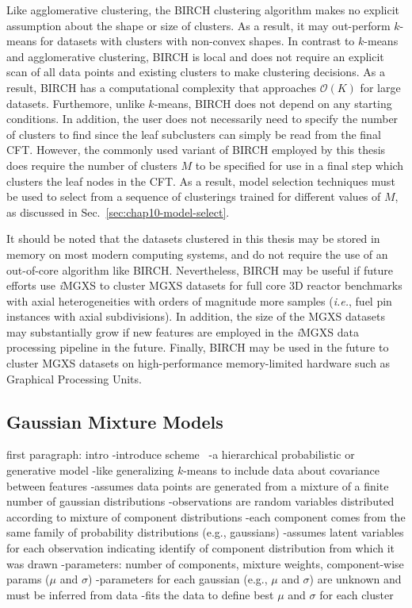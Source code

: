 Like agglomerative clustering, the BIRCH clustering algorithm makes no explicit assumption about the shape or size of clusters. As a result, it may out-perform $k$-means for datasets with clusters with non-convex shapes. In contrast to $k$-means and agglomerative clustering, BIRCH is local and does not require an explicit scan of all data points and existing clusters to make clustering decisions. As a result, BIRCH has a computational complexity that approaches $\mathcal{O}(K)$ for large datasets. Furthemore, unlike $k$-means, BIRCH does not depend on any starting conditions. In addition, the user does not necessarily need to specify the number of clusters to find since the leaf subclusters can simply be read from the final CFT. However, the commonly used variant of BIRCH employed by this thesis does require the number of clusters $M$ to be specified for use in a final step which clusters the leaf nodes in the CFT. As a result, model selection techniques must be used to select from a sequence of clusterings trained for different values of $M$, as discussed in Sec.~\ref{sec:chap10-model-select}.

It should be noted that the datasets clustered in this thesis may be stored in memory on most modern computing systems, and do not require the use of an out-of-core algorithm like BIRCH. Nevertheless, BIRCH may be useful if future efforts use \textit{i}\ac{MGXS} to cluster \ac{MGXS} datasets for full core 3D reactor benchmarks with axial heterogeneities with orders of magnitude more samples (\textit{i.e.}, fuel pin instances with axial subdivisions). In addition, the size of the \ac{MGXS} datasets may substantially grow if new features are employed in the \textit{i}\ac{MGXS} data processing pipeline in the future. Finally, BIRCH may be used in the future to cluster \ac{MGXS} datasets on high-performance memory-limited hardware such as Graphical Processing Units.

\subsection{Gaussian Mixture Models}
\label{subsec:chap10-gmms}

first paragraph: intro
-introduce scheme~\cite{mclachlan1988mixture}
-a hierarchical probabilistic or generative model
-like generalizing $k$-means to include data about covariance between features
-assumes data points are generated from a mixture of a finite number of gaussian distributions
  -observations are random variables distributed according to mixture of component distributions
  -each component comes from the same family of probability distributions (e.g., gaussians)
  -assumes latent variables for each observation indicating identify of component distribution from which it was drawn
-parameters: number of components, mixture weights, component-wise params ($\mu$ and $\sigma$)
  -parameters for each gaussian (e.g., $\mu$ and $\sigma$) are unknown and must be inferred from data
-fits the data to define best $\mu$ and $\sigma$ for each cluster

